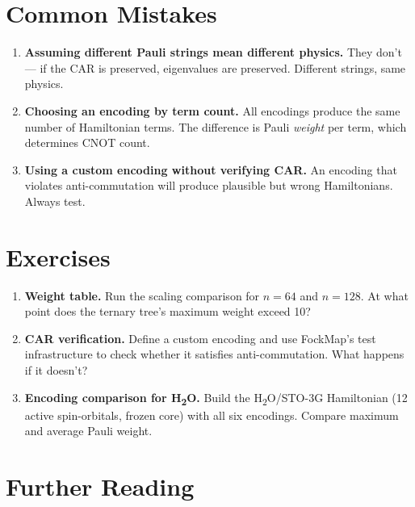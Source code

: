 \documentclass[
  11pt,
  oneside]{book}
\begin{document}
\section{Common Mistakes}\label{common-mistakes-6}

\begin{enumerate}
\def\labelenumi{\arabic{enumi}.}
\item
  \textbf{Assuming different Pauli strings mean different physics.} They
  don't --- if the CAR is preserved, eigenvalues are preserved.
  Different strings, same physics.
\item
  \textbf{Choosing an encoding by term count.} All encodings produce the
  same number of Hamiltonian terms. The difference is Pauli
  \emph{weight} per term, which determines CNOT count.
\item
  \textbf{Using a custom encoding without verifying CAR.} An encoding
  that violates anti-commutation will produce plausible but wrong
  Hamiltonians. Always test.
\end{enumerate}

\section{Exercises}\label{exercises-6}

\begin{enumerate}
\def\labelenumi{\arabic{enumi}.}
\item
  \textbf{Weight table.} Run the scaling comparison for \(n = 64\) and
  \(n = 128\). At what point does the ternary tree's maximum weight
  exceed 10?
\item
  \textbf{CAR verification.} Define a custom encoding and use FockMap's
  test infrastructure to check whether it satisfies anti-commutation.
  What happens if it doesn't?
\item
  \textbf{Encoding comparison for H\textsubscript{2}O.} Build the H\textsubscript{2}O/STO-3G Hamiltonian
  (12 active spin-orbitals, frozen core) with all six encodings. Compare
  maximum and average Pauli weight.
\end{enumerate}

\section{Further Reading}\label{further-reading-6}
\end{document}
